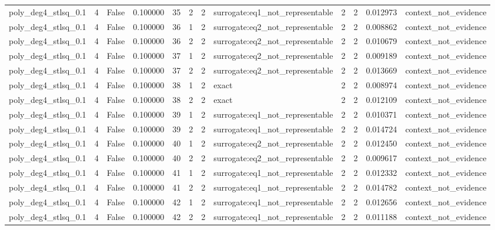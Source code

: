\begin{tabular}{lrrrrrrlrrrl}
poly\_deg4\_stlsq\_0.1 & 4 & False & 0.100000 & 35 & 2 & 2 & surrogate:eq1\_not\_representable & 2 & 2 & 0.012973 & context\_not\_evidence \\
poly\_deg4\_stlsq\_0.1 & 4 & False & 0.100000 & 36 & 1 & 2 & surrogate:eq2\_not\_representable & 2 & 2 & 0.008862 & context\_not\_evidence \\
poly\_deg4\_stlsq\_0.1 & 4 & False & 0.100000 & 36 & 2 & 2 & surrogate:eq2\_not\_representable & 2 & 2 & 0.010679 & context\_not\_evidence \\
poly\_deg4\_stlsq\_0.1 & 4 & False & 0.100000 & 37 & 1 & 2 & surrogate:eq2\_not\_representable & 2 & 2 & 0.009189 & context\_not\_evidence \\
poly\_deg4\_stlsq\_0.1 & 4 & False & 0.100000 & 37 & 2 & 2 & surrogate:eq2\_not\_representable & 2 & 2 & 0.013669 & context\_not\_evidence \\
poly\_deg4\_stlsq\_0.1 & 4 & False & 0.100000 & 38 & 1 & 2 & exact & 2 & 2 & 0.008974 & context\_not\_evidence \\
poly\_deg4\_stlsq\_0.1 & 4 & False & 0.100000 & 38 & 2 & 2 & exact & 2 & 2 & 0.012109 & context\_not\_evidence \\
poly\_deg4\_stlsq\_0.1 & 4 & False & 0.100000 & 39 & 1 & 2 & surrogate:eq1\_not\_representable & 2 & 2 & 0.010371 & context\_not\_evidence \\
poly\_deg4\_stlsq\_0.1 & 4 & False & 0.100000 & 39 & 2 & 2 & surrogate:eq1\_not\_representable & 2 & 2 & 0.014724 & context\_not\_evidence \\
poly\_deg4\_stlsq\_0.1 & 4 & False & 0.100000 & 40 & 1 & 2 & surrogate:eq2\_not\_representable & 2 & 2 & 0.012450 & context\_not\_evidence \\
poly\_deg4\_stlsq\_0.1 & 4 & False & 0.100000 & 40 & 2 & 2 & surrogate:eq2\_not\_representable & 2 & 2 & 0.009617 & context\_not\_evidence \\
poly\_deg4\_stlsq\_0.1 & 4 & False & 0.100000 & 41 & 1 & 2 & surrogate:eq1\_not\_representable & 2 & 2 & 0.012332 & context\_not\_evidence \\
poly\_deg4\_stlsq\_0.1 & 4 & False & 0.100000 & 41 & 2 & 2 & surrogate:eq1\_not\_representable & 2 & 2 & 0.014782 & context\_not\_evidence \\
poly\_deg4\_stlsq\_0.1 & 4 & False & 0.100000 & 42 & 1 & 2 & surrogate:eq1\_not\_representable & 2 & 2 & 0.012656 & context\_not\_evidence \\
poly\_deg4\_stlsq\_0.1 & 4 & False & 0.100000 & 42 & 2 & 2 & surrogate:eq1\_not\_representable & 2 & 2 & 0.011188 & context\_not\_evidence \\

\end{tabular}
